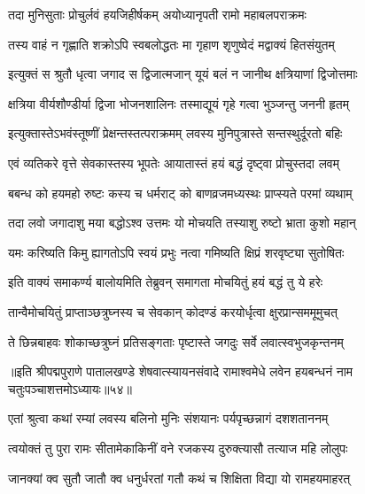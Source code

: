 \twolineshloka
{तदा मुनिसुताः प्रोचुर्लवं हयजिहीर्षकम्}
{अयोध्यानृपती रामो महाबलपराक्रमः}%

\twolineshloka
{तस्य वाहं न गृह्णाति शक्रोऽपि स्वबलोद्धतः}
{मा गृहाण शृणुष्वेदं मद्वाक्यं हितसंयुतम्}%

\twolineshloka
{इत्युक्तं स श्रुतौ धृत्वा जगाद स द्विजात्मजान्}
{यूयं बलं न जानीथ क्षत्रियाणां द्विजोत्तमाः}%

\twolineshloka
{क्षत्रिया वीर्यशौण्डीर्या द्विजा भोजनशालिनः}
{तस्माद्यूयं गृहे गत्वा भुञ्जन्तु जननी हृतम्}%

\twolineshloka
{इत्युक्तास्तेऽभवंस्तूष्णीं प्रेक्षन्तस्तत्पराक्रमम्}
{लवस्य मुनिपुत्रास्ते सन्तस्थुर्दूरतो बहिः}%

\twolineshloka
{एवं व्यतिकरे वृत्ते सेवकास्तस्य भूपतेः}
{आयातास्तं हयं बद्धं दृष्ट्वा प्रोचुस्तदा लवम्}%

\twolineshloka
{बबन्ध को हयमहो रुष्टः कस्य च धर्मराट्}
{को बाणव्रजमध्यस्थः प्राप्स्यते परमां व्यथाम्}%

\twolineshloka
{तदा लवो जगादाशु मया बद्धोऽश्व उत्तमः}
{यो मोचयति तस्याशु रुष्टो भ्राता कुशो महान्}%

\twolineshloka
{यमः करिष्यति किमु ह्यागतोऽपि स्वयं प्रभुः}
{नत्वा गमिष्यति क्षिप्रं शरवृष्ट्या सुतोषितः}%


\twolineshloka
{इति वाक्यं समाकर्ण्य बालोयमिति तेब्रुवन्}
{समागता मोचयितुं हयं बद्धं तु ये हरेः}%

\twolineshloka
{तान्वैमोचयितुं प्राप्ताञ्छत्रुघ्नस्य च सेवकान्}
{कोदण्डं करयोर्धृत्वा क्षुरप्रान्सममूमुचत्}%

\twolineshloka
{ते छिन्नबाहवः शोकाच्छत्रुघ्नं प्रतिसङ्गताः}
{पृष्टास्ते जगदुः सर्वे लवात्स्वभुजकृन्तनम्}%

॥इति श्रीपद्मपुराणे पातालखण्डे शेषवात्स्यायनसंवादे रामाश्वमेधे लवेन हयबन्धनं नाम चतुःपञ्चाशत्तमोऽध्यायः॥५४॥



\twolineshloka
{एतां श्रुत्वा कथां रम्यां लवस्य बलिनो मुनिः}
{संशयानः पर्यपृच्छन्नागं दशशताननम्}%


\twolineshloka
{त्वयोक्तं तु पुरा रामः सीतामेकाकिनीं वने}
{रजकस्य दुरुक्त्यासौ तत्याज महि लोलुपः}%

\twolineshloka
{जानक्यां क्व सुतौ जातौ क्व धनुर्धरतां गतौ}
{कथं च शिक्षिता विद्या यो रामहयमाहरत्}%

